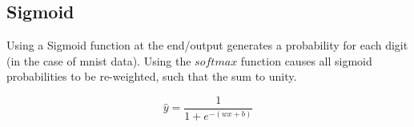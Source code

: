 \documentclass{article}
\numberwithin{equation}{subsection}
\begin{document}
\vfill\eject
\subsection{Sigmoid}\label{sec:sigmoid}

Using a Sigmoid function at the end/output generates a 
probability for each digit (in the case of mnist data).  Using 
the $softmax$ function causes all sigmoid probabilities to be 
re-weighted, such that the sum to unity.

\begin{equation}
  \hat{y} = \frac{1}{1 + e^{-(wx+b)}}
\end{equation}



\end{document}
